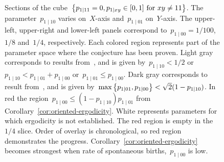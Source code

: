 %
%
%

\begin{figure}[htbp]
\centering

\caption{{Sections of the cube~$\left\{p_{1\mid11}=0, p_{1\mid xy}\in[0,1] \text{ for }xy\neq 11\right\}$. The parameter~$p_{1\mid10}$ varies on~$X$-axis and~$p_{1\mid01}$ on~$Y$-axis. The upper-left, upper-right and lower-left panels correspond to~$p_{1\mid00}=1/100$,~$1/8$ and~$1/4$, respectively.
Each colored region represents part of the parameter space where the conjecture has been proven. Light gray corresponds to results from~\cite{GluchowskiMenz2025}, and is given by~$p_{1\mid10}<1/2$ or~$p_{1\mid10}<p_{1\mid01}+p_{1\mid00}$
or~$p_{1\mid01}\leq p_{1\mid00}$.
Dark gray corresponds to result
from~\cite{GluchowskiMenz2026}, and is given by~$\max\left\{p_{1\mid01},p_{1\mid00}\right\}<\sqrt2(1-p_{1\mid10})$. In red the region~$p_{1\mid00}\leq(1-p_{1\mid10})p_{1\mid01}$ from
Corollary~\ref{cor:oriented-ergodicity}.
White represents parameters for which ergodicity is not established. The red region is empty in the~$1/4$ slice. Order of overlay is chronological, so red region demonstrates the progress. Corollary~\ref{cor:oriented-ergodicity} becomes strongest when rate of spontaneous births,~$p_{1\mid 00}$ is low.}}
\label{fig:simple-ips-ergodicity-regions}
\end{figure}
\endgroup

